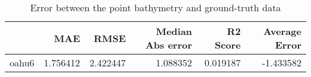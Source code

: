 \begin{table}[h!]
\centering
\caption{Error between the point bathymetry and ground-truth data}
\label{tab:oahu6_lidar_error}
\begin{tabular}{lrrrrr}
\toprule
 & MAE & RMSE & Median Abs error & R2 Score & Average Error \\
\midrule
oahu6 & 1.756412 & 2.422447 & 1.088352 & 0.019187 & -1.433582 \\
\bottomrule
\end{tabular}
\end{table}

